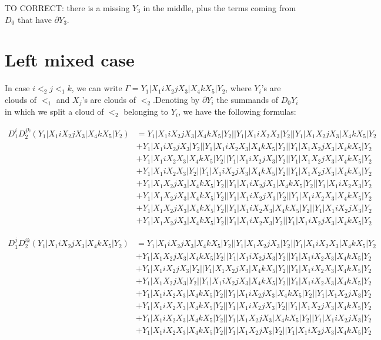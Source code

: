 \documentclass{article}[12pt]
\begin{document}
TO CORRECT: there is a missing $Y_3$ in the middle, plus the terms coming from $D_0$ that have $\partial Y_3$.
\section*{Left mixed case}
In case $i<_2 j <_1 k$, we can write  $\Gamma = Y_1|X_1 i X_2 j X_3 |X_4 k X_5 | Y_2$, where $Y_i$'s are clouds of $<_1$ and $X_j$'s are clouds of $<_2$.Denoting by $\partial Y_i$ the summands of $D_0 Y_i$ in which we split a cloud of $<_2$ belonging to $Y_i$, we have the following formulas:

\begin{align*}
D_1^iD_2^{jk}(Y_1|X_1iX_2jX_3|X_4kX_5|Y_2)& =Y_1|X_1iX_2jX_3|X_4kX_5|Y_2||Y_1|X_1iX_2X_3|Y_2||Y_1|X_1X_2jX_3|X_4kX_5|Y_2\\ 
 & +Y_1|X_1iX_2jX_3|Y_2||Y_1|X_1iX_2X_3|X_4kX_5|Y_2||Y_1|X_1X_2jX_3|X_4kX_5|Y_2\\ 
 & +Y_1|X_1iX_2X_3|X_4kX_5|Y_2||Y_1|X_1iX_2jX_3|Y_2||Y_1|X_1X_2jX_3|X_4kX_5|Y_2\\ 
 & +Y_1|X_1iX_2X_3|Y_2||Y_1|X_1iX_2jX_3|X_4kX_5|Y_2||Y_1|X_1X_2jX_3|X_4kX_5|Y_2\\ 
 & +Y_1|X_1X_2jX_3|X_4kX_5|Y_2||Y_1|X_1iX_2jX_3|X_4kX_5|Y_2||Y_1|X_1iX_2X_3|Y_2\\ 
 & +Y_1|X_1X_2jX_3|X_4kX_5|Y_2||Y_1|X_1iX_2jX_3|Y_2||Y_1|X_1iX_2X_3|X_4kX_5|Y_2\\ 
 & +Y_1|X_1X_2jX_3|X_4kX_5|Y_2||Y_1|X_1iX_2X_3|X_4kX_5|Y_2||Y_1|X_1iX_2jX_3|Y_2\\ 
 & +Y_1|X_1X_2jX_3|X_4kX_5|Y_2||Y_1|X_1iX_2X_3|Y_2||Y_1|X_1iX_2jX_3|X_4kX_5|Y_2\end{align*}

\begin{align*}
D_1^jD_2^{ik}(Y_1|X_1iX_2jX_3|X_4kX_5|Y_2)& =Y_1|X_1iX_2jX_3|X_4kX_5|Y_2||Y_1|X_1X_2jX_3|Y_2||Y_1|X_1iX_2X_3|X_4kX_5|Y_2\\ 
 & +Y_1|X_1X_2jX_3|X_4kX_5|Y_2||Y_1|X_1iX_2jX_3|Y_2||Y_1|X_1iX_2X_3|X_4kX_5|Y_2\\ 
 & +Y_1|X_1iX_2jX_3|Y_2||Y_1|X_1X_2jX_3|X_4kX_5|Y_2||Y_1|X_1iX_2X_3|X_4kX_5|Y_2\\ 
 & +Y_1|X_1X_2jX_3|Y_2||Y_1|X_1iX_2jX_3|X_4kX_5|Y_2||Y_1|X_1iX_2X_3|X_4kX_5|Y_2\\ 
 & +Y_1|X_1iX_2X_3|X_4kX_5|Y_2||Y_1|X_1iX_2jX_3|X_4kX_5|Y_2||Y_1|X_1X_2jX_3|Y_2\\ 
 & +Y_1|X_1iX_2X_3|X_4kX_5|Y_2||Y_1|X_1iX_2jX_3|Y_2||Y_1|X_1X_2jX_3|X_4kX_5|Y_2\\ 
 & +Y_1|X_1iX_2X_3|X_4kX_5|Y_2||Y_1|X_1X_2jX_3|X_4kX_5|Y_2||Y_1|X_1iX_2jX_3|Y_2\\ 
 & +Y_1|X_1iX_2X_3|X_4kX_5|Y_2||Y_1|X_1X_2jX_3|Y_2||Y_1|X_1iX_2jX_3|X_4kX_5|Y_2\end{align*}
\end{document}
